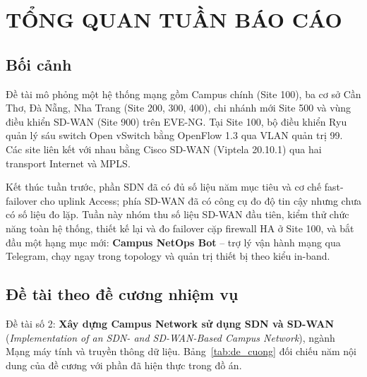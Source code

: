 \section{TỔNG QUAN TUẦN BÁO CÁO}\label{sec:tong_quan}

\subsection{Bối cảnh}

Đề tài mô phỏng một hệ thống mạng gồm Campus chính (Site 100), ba cơ sở Cần Thơ, Đà Nẵng, Nha Trang (Site 200, 300, 400), chi nhánh mới Site 500 và vùng điều khiển SD-WAN (Site 900) trên EVE-NG. Tại Site 100, bộ điều khiển Ryu quản lý sáu switch Open vSwitch bằng OpenFlow 1.3 qua VLAN quản trị 99. Các site liên kết với nhau bằng Cisco SD-WAN (Viptela 20.10.1) qua hai transport Internet và MPLS.

Kết thúc tuần trước, phần SDN đã có đủ số liệu năm mục tiêu và cơ chế fast-failover cho uplink Access; phía SD-WAN đã có công cụ đo độ tin cậy nhưng chưa có số liệu đo lặp. Tuần này nhóm thu số liệu SD-WAN đầu tiên, kiểm thử chức năng toàn hệ thống, thiết kế lại và đo failover cặp firewall HA ở Site 100, và bắt đầu một hạng mục mới: \textbf{Campus NetOps Bot} -- trợ lý vận hành mạng qua Telegram, chạy ngay trong topology và quản trị thiết bị theo kiểu in-band.

\subsection{Đề tài theo đề cương nhiệm vụ}

Đề tài số 2: \textbf{Xây dựng Campus Network sử dụng SDN và SD-WAN} (\textit{Implementation of an SDN- and SD-WAN-Based Campus Network}), ngành Mạng máy tính và truyền thông dữ liệu. Bảng~\ref{tab:de_cuong} đối chiếu năm nội dung của đề cương với phần đã hiện thực trong đồ án.

